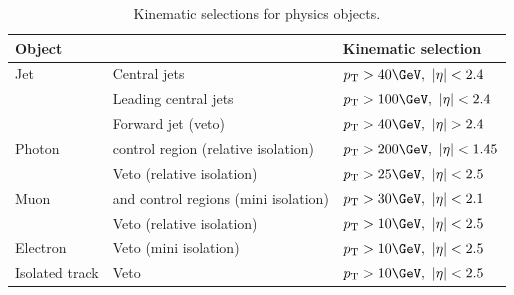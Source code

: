 \begin{table}[h!]
  \caption{Kinematic selections for physics objects.\label{tab:kine-sel}}
  \centering
  \footnotesize
  \begin{tabular}{ lll }
    \hline
    \hline
    Object 	& 	&Kinematic selection \\
    \hline
    \hline
    Jet  		&Central jets& $\pt > 40 \GeV,\ \etaabs < 2.4$		    \\
			&Leading central jets&	$\pt > 100 \GeV,\ \etaabs < 2.4$	\\	    	    
			&Forward jet (veto) &$\pt > 40 \GeV,\ \etaabs > 2.4$	\\	    
    Photon  		&\gj control region (relative isolation)& $\pt > 200 \GeV,\ \etaabs < 1.45$	\\	    
			&Veto (relative isolation)& $\pt > 25 \GeV,\ \etaabs < 2.5$		    \\
    Muon  		&\mj and \mmj control regions (mini isolation)& $\pt > 30 \GeV,\ \etaabs < 2.1$	\\	    
			&Veto (relative isolation)& $\pt > 10 \GeV,\ \etaabs < 2.5$		    \\
    Electron  		&Veto (mini isolation)& $\pt > 10 \GeV,\ \etaabs < 2.5$		    \\
    Isolated track  	&Veto& $\pt > 10 \GeV,\ \etaabs < 2.5$		    \\
		
    
    \hline
    \hline
  \end{tabular}
  \end{table}

